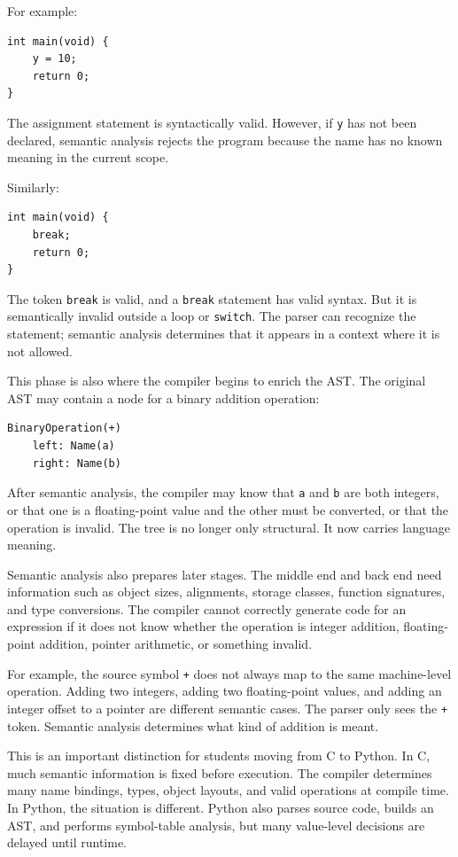 For example:

\begin{verbatim}
int main(void) {
    y = 10;
    return 0;
}
\end{verbatim}

The assignment statement is syntactically valid. However, if \texttt{y} has not been declared, semantic analysis rejects the program because the name has no known meaning in the current scope.

Similarly:

\begin{verbatim}
int main(void) {
    break;
    return 0;
}
\end{verbatim}

The token \texttt{break} is valid, and a \texttt{break} statement has valid syntax. But it is semantically invalid outside a loop or \texttt{switch}. The parser can recognize the statement; semantic analysis determines that it appears in a context where it is not allowed.

This phase is also where the compiler begins to enrich the AST. The original AST may contain a node for a binary addition operation:

\begin{verbatim}
BinaryOperation(+)
    left: Name(a)
    right: Name(b)
\end{verbatim}

After semantic analysis, the compiler may know that \texttt{a} and \texttt{b} are both integers, or that one is a floating-point value and the other must be converted, or that the operation is invalid. The tree is no longer only structural. It now carries language meaning.

Semantic analysis also prepares later stages. The middle end and back end need information such as object sizes, alignments, storage classes, function signatures, and type conversions. The compiler cannot correctly generate code for an expression if it does not know whether the operation is integer addition, floating-point addition, pointer arithmetic, or something invalid.

For example, the source symbol \texttt{+} does not always map to the same machine-level operation. Adding two integers, adding two floating-point values, and adding an integer offset to a pointer are different semantic cases. The parser only sees the \texttt{+} token. Semantic analysis determines what kind of addition is meant.

This is an important distinction for students moving from C to Python. In C, much semantic information is fixed before execution. The compiler determines many name bindings, types, object layouts, and valid operations at compile time. In Python, the situation is different. Python also parses source code, builds an AST, and performs symbol-table analysis, but many value-level decisions are delayed until runtime.

